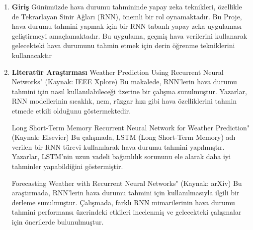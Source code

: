 \documentclass[12pt,a4paper]{article}
\begin{document}
	\begin{enumerate}
	\item {\bf\fontsize{12pt}{14pt}\selectfont Giriş}\newline\newline
Günümüzde hava durumu tahmininde yapay zeka teknikleri, özellikle de Tekrarlayan Sinir Ağları (RNN), önemli bir rol oynamaktadır. Bu Proje, hava durumu tahmini yapmak için bir RNN tabanlı yapay zeka uygulaması geliştirmeyi amaçlamaktadır. Bu uygulama, geçmiş hava verilerini kullanarak gelecekteki hava durumunu tahmin etmek için derin öğrenme tekniklerini kullanacaktır

	
\item {\bf\fontsize{12pt}{14pt}\selectfont Literatür Araştırması} \newline\newline
	Weather Prediction Using Recurrent Neural Networks" (Kaynak: IEEE Xplore)
Bu makalede, RNN'lerin hava durumu tahmini için nasıl kullanılabileceği üzerine bir çalışma sunulmuştur. Yazarlar, RNN modellerinin sıcaklık, nem, rüzgar hızı gibi hava özelliklerini tahmin etmede etkili olduğunu göstermektedir.

Long Short-Term Memory Recurrent Neural Network for Weather Prediction" (Kaynak: Elsevier)
Bu çalışmada, LSTM (Long Short-Term Memory) adı verilen bir RNN türevi kullanılarak hava durumu tahmini yapılmıştır. Yazarlar, LSTM'nin uzun vadeli bağımlılık sorununu ele alarak daha iyi tahminler yapabildiğini göstermiştir.

Forecasting Weather with Recurrent Neural Networks" (Kaynak: arXiv)
Bu araştırmada, RNN'lerin hava durumu tahmini için kullanılmasıyla ilgili bir derleme sunulmuştur. Çalışmada, farklı RNN mimarilerinin hava durumu tahmini performansı üzerindeki etkileri incelenmiş ve gelecekteki çalışmalar için önerilerde bulunulmuştur.


\end{enumerate}
\end{document}
